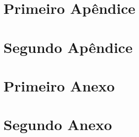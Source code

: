 \documentclass[
	12pt,				    %
	openright,			    %
	oneside,			    %
	a4paper,			    %
    sumario=tradicional,    %
	english,			    %
	brazil,				    %
	]{abntex2}
\begin{document}
\postextual


\thispagestyle{empty}


%
\begin{apendicesenv}
%
\partapendices
%
\chapter{Primeiro Apêndice}
%
\chapter{Segundo Apêndice}
%
\end{apendicesenv}
%
%
\begin{anexosenv}
%
\partanexos
%
\chapter{Primeiro Anexo}
%
\chapter{Segundo Anexo}
%
\end{anexosenv}
\end{document}

